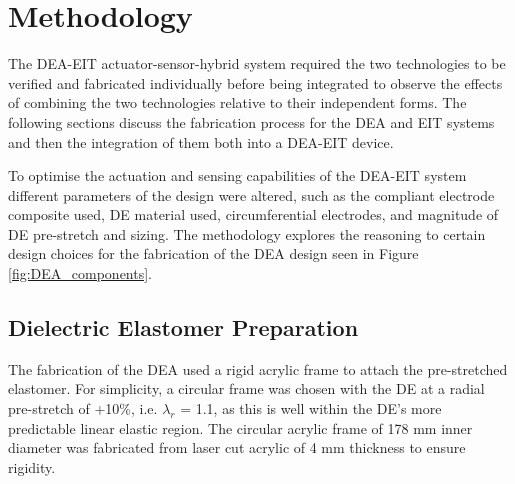 



\section{Methodology} %
\label{sec:method}
The DEA-EIT actuator-sensor-hybrid system required the two technologies to be verified and fabricated individually before being integrated to observe the effects of combining the two technologies relative to their independent forms. The following sections discuss the fabrication process for the DEA and EIT systems and then the integration of them both into a DEA-EIT device.

To optimise the actuation and sensing capabilities of the DEA-EIT system different parameters of the design were altered, such as the compliant electrode composite used, DE material used, circumferential electrodes, and magnitude of DE pre-stretch and sizing. The methodology explores the reasoning to certain design choices for the fabrication of the DEA design seen in Figure \ref{fig:DEA_components}.


\subsection{Dielectric Elastomer Preparation}
\label{subsec:de_fab}
The fabrication of the DEA used a rigid acrylic frame to attach the pre-stretched elastomer. For simplicity, a circular frame was chosen with the DE at a radial pre-stretch of +10\%, i.e. $\lambda_r$ = 1.1, as this is well within the DE's more predictable linear elastic region. The circular acrylic frame of 178 mm inner diameter was fabricated from laser cut acrylic of 4 mm thickness to ensure rigidity.

